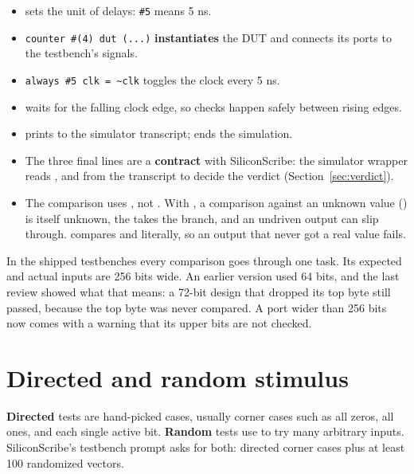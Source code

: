 \begin{itemize}
  \item {} sets the unit of delays: \texttt{\#5} means 5 ns.
  \item \texttt{counter \#(4) dut (...)} \textbf{instantiates} the DUT and connects its ports to the testbench's signals.
  \item \texttt{always \#5 clk = \textasciitilde clk} toggles the clock every 5 ns.
  \item {} waits for the falling clock edge, so checks happen safely between rising edges.
  \item {} prints to the simulator transcript;  ends the simulation.
  \item The three final lines are a \textbf{contract} with SiliconScribe: the simulator wrapper reads ,  and  from the transcript to decide the verdict (Section~\ref{sec:verdict}).
  \item The comparison uses \code{===}, not \code{==}. With \code{==}, a comparison against an unknown value () is itself unknown, the  takes the  branch, and an undriven output can slip through. \code{===} compares  and  literally, so an output that never got a real value fails.
\end{itemize}

\begin{keyidea}
In the shipped testbenches every comparison goes through one  task. Its expected and actual inputs are 256 bits wide. An earlier version used 64 bits, and the last review showed what that means: a 72-bit design that dropped its top byte still passed, because the top byte was never compared. A port wider than 256 bits now comes with a warning that its upper bits are not checked.
\end{keyidea}

\section{Directed and random stimulus}

\textbf{Directed} tests are hand-picked cases, usually corner cases such as all zeros, all ones, and each single active bit. \textbf{Random} tests use  to try many arbitrary inputs. SiliconScribe's testbench prompt asks for both: directed corner cases plus at least 100 randomized vectors.

